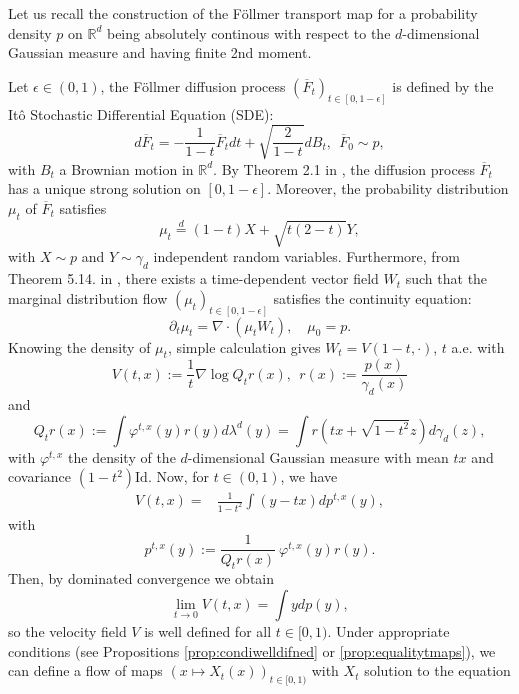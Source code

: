 \documentclass{article}
\begin{document}
Let us recall the construction of the Föllmer transport map for  a probability density $p$ on $\mathbb{R}^d$ being absolutely continous with respect to the $d$-dimensional Gaussian measure and having finite 2nd moment.


Let $\epsilon\in (0,1)$, the Föllmer diffusion process $(\overline{F}_t)_{t\in [0,1-\epsilon]}$ is defined by the  Itô Stochastic Differential Equation (SDE):
\begin{equation*}
    d\overline{F}_t=-\frac{1}{1-t}\overline{F}_tdt+\sqrt{\frac{2}{1-t}}dB_t,\ \ \overline{F}_0\sim p,
\end{equation*}
with $B_t$ a Brownian motion in $\mathbb{R}^d$.
By Theorem 2.1 in \cite[Chapter 9]{revuz2013continuous},  the diffusion process $\overline{F}_t$  has a
unique strong solution on $[0,1-\epsilon]$.  Moreover, the probability distribution $\mu_t$ of $\overline{F}_t$ satisfies
\begin{equation}\label{eq:laxXt}
\mu_t\overset{d}{=} (1-t)X+\sqrt{t(2-t)}Y, 
\end{equation}
with $X\sim p$ and $Y\sim \gamma_d$ independent random variables.  Furthermore, from Theorem 5.14. in \cite{santambrogio2015optimal}, there exists a time-dependent vector field $W_t$ such that the marginal distribution flow $(\mu_t)_{t\in [0,1-\epsilon]}$ satisfies the continuity equation:
\begin{equation}\label{eq:continuityeq}
\partial_t \mu_t = \nabla \cdot (\mu_t W_t),\quad \mu_0=p.
\end{equation}
Knowing the density of $\mu_t$, simple calculation gives  $W_t=V(1-t,\cdot)$, $t$ a.e. with
\begin{equation}\label{eq:V}
    V(t,x):=\frac{1}{t} \nabla \log Q_t r(x), \ \ r(x):=\frac{p(x)}{\gamma_d(x)}
\end{equation}
and 
\begin{equation}\label{eq:Qtr}
    Q_t r(x):= \int \varphi^{t,x}(y)r(y)d\lambda^d(y)= \int r(tx+\sqrt{1-t^2}z)d\gamma_d(z),
\end{equation}
with $\varphi^{t,x}$ the density of the $d$-dimensional Gaussian measure with mean $tx$ and covariance $(1-t^2)\text{Id}$. Now, for $t\in (0,1)$, we have
\begin{align*}
    V(t,x) = & \frac{1}{1-t^2}\int (y-tx)dp^{t,x}(y),
\end{align*}
with
$$p^{t,x}(y):=\frac{ 1}{Q_tr(x)}\ \varphi^{t,x}(y)r(y).$$
Then, by dominated convergence we obtain 
$$\lim_{t\rightarrow 0} V(t,x) = \int y dp(y),$$
so the velocity field $V$ is well defined for all $t\in [0,1).$ Under appropriate conditions (see Propositions \ref{prop:condiwelldifned} or \ref{prop:equalitytmaps}), we can define a flow of maps $\left(x\mapsto X_t(x)\right)_{t\in [0,1)}$ with $X_t$ solution to the equation
\end{document}
